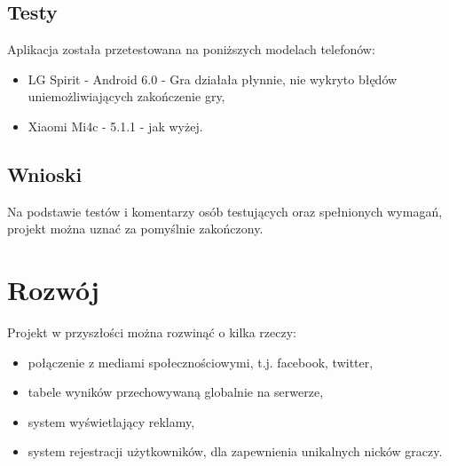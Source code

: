 \documentclass[a4paper, 11pt]{article}
\begin{document}
\subsection{Testy}
Aplikacja została przetestowana na poniższych modelach telefonów:
\begin{itemize}
\item LG Spirit - Android 6.0 - Gra działała płynnie, nie wykryto błędów uniemożliwiających zakończenie gry,
\item Xiaomi Mi4c - 5.1.1 - jak wyżej.	
\end{itemize}

\subsection{Wnioski}
Na podstawie testów i komentarzy osób testujących oraz spełnionych wymagań, projekt można uznać za pomyślnie zakończony.


\vfill
\newpage
\section{Rozwój}
Projekt w przyszłości można rozwinąć o kilka rzeczy:
\begin{itemize}
\item połączenie z mediami społecznościowymi, t.j. facebook, twitter,
\item tabele wyników przechowywaną globalnie na serwerze,
\item system wyświetlający reklamy,
\item system rejestracji użytkowników, dla zapewnienia unikalnych nicków graczy.
\end{itemize}

	
\end{document}
